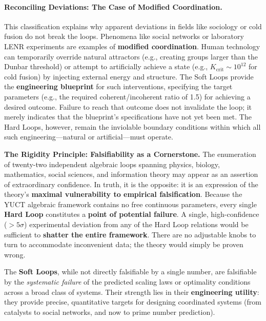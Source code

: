 \documentclass[12pt,a4paper]{article}
\begin{document}
	\paragraph{Reconciling Deviations: The Case of Modified Coordination.}
	This classification explains why apparent deviations in fields like sociology or cold fusion do not break the loops. Phenomena like social networks or laboratory LENR experiments are examples of \textbf{modified coordination}. Human technology can temporarily override natural attractors (e.g., creating groups larger than the Dunbar threshold) or attempt to artificially achieve a state (e.g., \(K_{\mathrm{crit}} \sim 10^{12}\) for cold fusion) by injecting external energy and structure. The Soft Loops provide the \textbf{engineering blueprint} for such interventions, specifying the target parameters (e.g., the required coherent/incoherent ratio of 1.5) for achieving a desired outcome. Failure to reach that outcome does not invalidate the loop; it merely indicates that the blueprint's specifications have not yet been met. The Hard Loops, however, remain the inviolable boundary conditions within which all such engineering—natural or artificial—must operate.
	
	\vspace{0.5cm}
	\noindent
	\textbf{The Rigidity Principle: Falsifiability as a Cornerstone.}
	The enumeration of twenty-two independent algebraic loops spanning physics, biology, mathematics, social sciences, and information theory may appear as an assertion of extraordinary confidence. In truth, it is the opposite: it is an expression of the theory's \textbf{maximal vulnerability to empirical falsification}. Because the YUCT algebraic framework contains no free continuous parameters, every single \textbf{Hard Loop} constitutes a \textbf{point of potential failure}. A single, high-confidence ($>5\sigma$) experimental deviation from any of the Hard Loop relations would be sufficient to \textbf{shatter the entire framework}. There are no adjustable knobs to turn to accommodate inconvenient data; the theory would simply be proven wrong.
	
	The \textbf{Soft Loops}, while not directly falsifiable by a single number, are falsifiable by the \textit{systematic failure} of the predicted scaling laws or optimality conditions across a broad class of systems. Their strength lies in their \textbf{engineering utility}: they provide precise, quantitative targets for designing coordinated systems (from catalysts to social networks, and now to prime number prediction).
	
\end{document}
